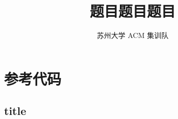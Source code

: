 \documentclass[lang=cn]{elegantpaper}
\title{题目题目题目}
\author{苏州大学 ACM 集训队}
\newcommand\addCode[1]{%
    \subsection{#1}%
    }
\begin{document}
\maketitle
\tableofcontents







\section{参考代码}
\addCode{title}
\end{document}
